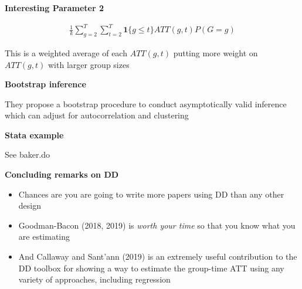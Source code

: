 \documentclass[notes=show]{beamer}
\begin{document}
\begin{frame}[plain]
\begin{center}
\textbf{Interesting Parameter 2}
\end{center}

\begin{eqnarray*}
\frac{1}{k} \sum_{g=2}^T \sum_{t=2}^T \textbf{1}\{g \leq t\} ATT(g,t) P(G=g)
\end{eqnarray*}

This is a weighted average of each $ATT(g, t)$ putting more weight on $ATT(g, t)$ with larger group sizes

\end{frame}

\begin{frame}[plain]
\begin{center}
\textbf{Bootstrap inference}
\end{center}

They propose a bootstrap procedure to conduct asymptotically valid inference which can adjust for autocorrelation and clustering

\end{frame}

\begin{frame}[plain]
\begin{center}
\textbf{Stata example}
\end{center}

See baker.do

\end{frame}


\begin{frame}[plain]
\begin{center}
\textbf{Concluding remarks on DD}
\end{center}

\begin{itemize}
\item Chances are you are going to write more papers using DD than any other design
\item Goodman-Bacon (2018, 2019) is \emph{worth your time} so that you know what you are estimating
\item And Callaway and Sant'ann (2019) is an extremely useful contribution to the DD toolbox for showing a way to estimate the group-time ATT using any variety of approaches, including regression
\end{itemize}

\end{frame}
\end{document}
